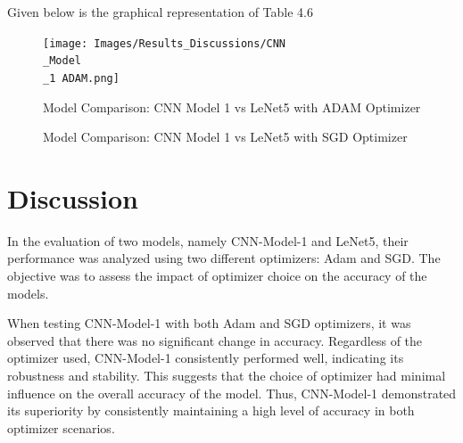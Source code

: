 \clearpage

\noindent Given below is the graphical representation of Table 4.6

\begin{figure}[htbp]
  \centering

  \texttt{[image: Images/Results\_Discussions/CNN\\\_Model\\\_1 ADAM.png]}
  \hfill
  \caption{Model Comparison: CNN Model 1 vs LeNet5 with ADAM Optimizer}

  \vspace{0.5cm} %

  \hfill
  \caption{Model Comparison: CNN Model 1 vs LeNet5 with SGD Optimizer}
  
\end{figure}

\section{Discussion}

In the evaluation of two models, namely CNN-Model-1 and LeNet5, their performance was analyzed using two different optimizers: Adam and SGD. The objective was to assess the impact of optimizer choice on the accuracy of the models.

\noindent When testing CNN-Model-1 with both Adam and SGD optimizers, it was observed that there was no significant change in accuracy. Regardless of the optimizer used, CNN-Model-1 consistently performed well, indicating its robustness and stability. This suggests that the choice of optimizer had minimal influence on the overall accuracy of the model. Thus, CNN-Model-1 demonstrated its superiority by consistently maintaining a high level of accuracy in both optimizer scenarios.

